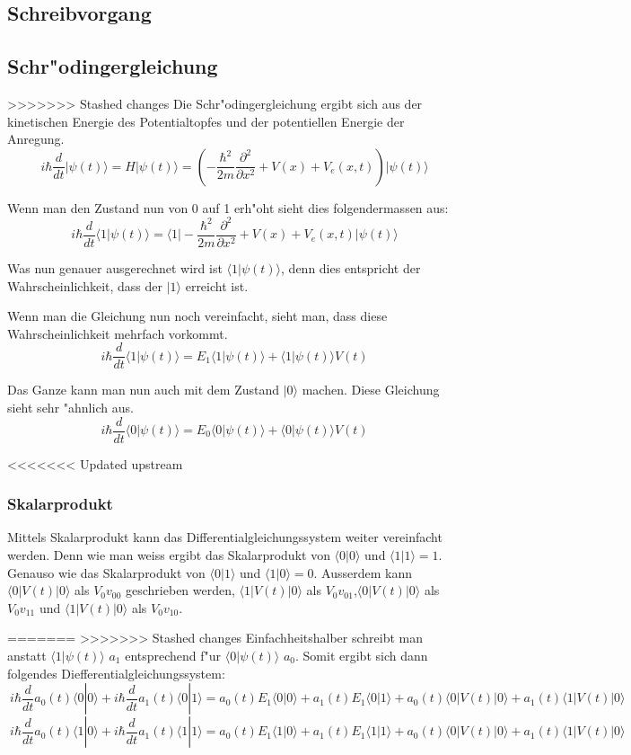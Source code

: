 \begin{refsection}
\section{Schreibvorgang}

\subsection{Schr"odingergleichung}
>>>>>>> Stashed changes
Die Schr"odingergleichung ergibt sich aus der kinetischen Energie des Potentialtopfes und der potentiellen Energie der Anregung.
\[
\ i\hbar\frac{d}{dt}|\psi(t)\rangle = H|\psi(t)\rangle = (-\frac{\hbar^2}{2m} \frac{\partial^2}{\partial x^2}+V(x)+V_{e}(x,t))|\psi(t)\rangle
\]

Wenn man den Zustand nun von 0 auf 1 erh"oht sieht dies folgendermassen aus:
\[
\ i\hbar\frac{d}{dt}\langle1|\psi(t)\rangle = \langle1|-\frac{\hbar^2}{2m} \frac{\partial^2}{\partial x^2}+V(x)+V_{e}(x,t)|\psi(t)\rangle
\]

Was nun genauer ausgerechnet wird ist $\langle1|\psi(t)\rangle$, denn dies entspricht der Wahrscheinlichkeit, dass der $|1\rangle$ erreicht ist.

Wenn man die Gleichung nun noch vereinfacht, sieht man, dass diese Wahrscheinlichkeit mehrfach vorkommt.
\[
\ i\hbar\frac{d}{dt}\langle1|\psi(t)\rangle = E_{1}\langle1|\psi(t)\rangle+\langle1|\psi(t)\rangle V(t)
\]

Das Ganze kann man nun auch mit dem Zustand $|0\rangle$ machen. Diese Gleichung sieht sehr "ahnlich aus.
\[
\ i\hbar\frac{d}{dt}\langle0|\psi(t)\rangle = E_{0}\langle0|\psi(t)\rangle+\langle0|\psi(t)\rangle V(t)
\]

<<<<<<< Updated upstream
\subsubsection{Skalarprodukt}
Mittels Skalarprodukt kann das Differentialgleichungssystem weiter vereinfacht werden.
Denn wie man weiss ergibt das Skalarprodukt von $\langle0|0\rangle$ und $\langle1|1\rangle = 1$. Genauso wie das Skalarprodukt von $\langle0|1\rangle$ und $\langle1|0\rangle = 0$.
Ausserdem kann  $\langle0|V(t)|0\rangle$ als $V_{0}v_{00}$ geschrieben werden, $\langle1|V(t)|0\rangle$ als $V_{0}v_{01}$,$\langle0|V(t)|0\rangle$ als $V_{0}v_{11}$ und $\langle1|V(t)|0\rangle$ als $V_{0}v_{10}$.

=======
>>>>>>> Stashed changes
Einfachheitshalber schreibt man anstatt $\langle1|\psi(t)\rangle$ $a_1$ entsprechend f"ur $\langle0|\psi(t)\rangle$ $a_0$. Somit ergibt sich dann folgendes Diefferentialgleichungssystem:
\[
\ i\hbar\frac{d}{dt}a_{0}(t)\langle0|0\rangle +i\hbar\frac{d}{dt}a_{1}(t)\langle0|1\rangle = a_{0}(t)E_{1}\langle0|0\rangle + a_{1}(t)E_{1}\langle0|1\rangle + a_{0}(t)\langle0|V(t)|0\rangle+ a_{1}(t)\langle1|V(t)|0\rangle
\]
\[
\ i\hbar\frac{d}{dt}a_{0}(t)\langle1|0\rangle +i\hbar\frac{d}{dt}a_{1}(t)\langle1|1\rangle = a_{0}(t)E_{1}\langle1|0\rangle + a_{1}(t)E_{1}\langle1|1\rangle + a_{0}(t)\langle0|V(t)|0\rangle+ a_{1}(t)\langle1|V(t)|0\rangle
\]


\end{refsection}
